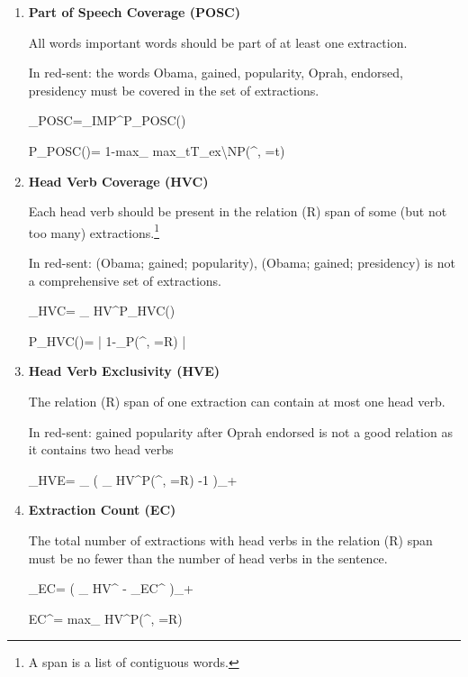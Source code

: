 \begin{enumerate}

\item {\bf Part of Speech Coverage (POSC)}

All words important words should be part of at least one extraction.

In red-sent: the words {\color{red}Obama, gained, popularity,
Oprah, endorsed, presidency} must be covered in
the set of extractions.

\beq
\call_{POSC}=\sum_{\alp\in [\ell]}IMP^{\alp}P_{POSC}(\alp)
\eeq

\beq
P_{POSC}(\alp)=
1-{\rm max}_{\mu\in [M]}
{\rm max}_{t\in T_{ex}\backslash N}P(\rvt^{\mu, \alp}=t)
\eeq

\item {\bf Head Verb Coverage (HVC)}

Each head verb
should be present in the relation (R) span of some
(but not too many) extractions.\footnote{A span is a list of contiguous words.}

In red-sent: {\color{red} (Obama;
gained; popularity), (Obama; gained; presidency)} is not a comprehensive set of extractions.

\beq
\call_{HVC}=
\sum_{\alp\in [\ell]}
HV^\alp P_{HVC}(\alp)
\eeq

\beq
P_{HVC}(\alp)=
\left|
1-\sum_{\mu\in [M]}P(\rvt^{\mu, \alp}=R)
\right|
\eeq

\item {\bf Head Verb Exclusivity (HVE)}

The relation (R) span
of one extraction can contain at most one head
verb.

In red-sent: {\color{red}gained popularity after Oprah endorsed} is not a good relation as it contains two
head verbs

\beq
\call_{HVE}=
\sum_{\mu\in [M]}
\left(
\sum_{\alp\in [\ell]}
HV^\alp P(\rvt^{\mu, \alp}=R)
-1
\right)_+
\eeq

\item {\bf Extraction Count (EC)}

The total number of extractions with head verbs in the relation (R) span
must be no fewer than the number of head verbs
in the sentence.

\beq
\call_{EC}=
\left(
\sum_{\alp\in[\ell]} HV^\alp
-
\sum_{\mu\in [M]}EC^\mu
\right)_+
\eeq

\beq
EC^\mu=
{\rm max}_{\alp\in [\ell]}
HV^\alp P(\rvt^{\mu, \alp}=R)
\eeq


\end{enumerate}





